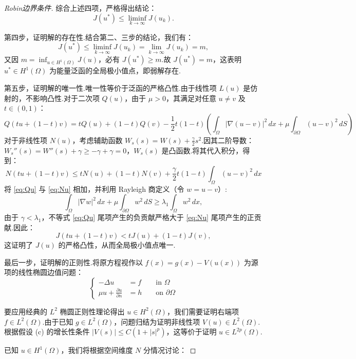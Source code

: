 \begin{proof}[Robin边界条件]
综合上述四项，严格得出结论：
$$J(u^*) \le \liminf_{k \to \infty} J(u_k).$$

第四步，证明解的存在性.结合第二、三步的结论，我们有：
$$J(u^*) \le \liminf_{k \to \infty} J(u_k) = \lim_{k \to \infty} J(u_k) = m,$$
又因 $m = \inf_{u \in H^1(\Omega)} J(u)$，必有 $J(u^*) \ge m$.故 $J(u^*) = m$，这表明 $u^{*} \in H^1(\Omega)$ 为能量泛函的全局极小值点，即弱解存在.

第五步，证明解的唯一性.唯一性等价于泛函的严格凸性.由于线性项 $L(u)$ 是仿射的，不影响凸性.对于二次项 $Q(u)$，由于 $\mu > 0$，其满足对任意 $u \neq v$ 及 $t \in (0, 1)$：
\begin{equation}\label{eq:Qu}
Q(tu + (1-t)v) = tQ(u) + (1-t)Q(v) - \frac{1}{2}t(1-t)\left( \int_{\Omega} |\nabla(u-v)|^2 \, dx + \mu \int_{\partial \Omega} (u-v)^2 \, dS \right)
\end{equation}
对于非线性项 $N(u)$，考虑辅助函数 $W_s(s) = W(s) + \frac{\gamma}{2}s^2$.因其二阶导数：$W_s''(s) = W''(s) + \gamma \ge -\gamma + \gamma = 0$，$W_s(s)$ 是凸函数.将其代入积分，得到：
\begin{equation}\label{eq:Nu}
N(tu + (1-t)v) \le tN(u) + (1-t)N(v) + \frac{\gamma}{2}t(1-t)\int_{\Omega} (u-v)^2 \, dx
\end{equation}
将 \eqref{eq:Qu} 与 \eqref{eq:Nu} 相加，并利用 Rayleigh 商定义（令 $w = u - v$）:
$$\int_{\Omega} |\nabla w|^2 \, dx + \mu \int_{\partial \Omega} w^2 \, dS \ge \lambda_1 \int_{\Omega} w^2 \, dx,$$
由于 $\gamma < \lambda_1$，不等式 \eqref{eq:Qu} 尾项产生的负贡献严格大于 \eqref{eq:Nu} 尾项产生的正贡献.因此：
$$J(tu + (1-t)v) < tJ(u) + (1-t)J(v),$$
这证明了 $J(u)$ 的严格凸性，从而全局极小值点唯一.

最后一步，证明解的正则性.将原方程视作以 $f(x)=g(x) - V(u(x))$ 为源项的线性椭圆边值问题：
\begin{equation}\label{eq:linearized}
\left\{\begin{aligned}
-\Delta u &=f & & \text { in } \Omega \\
 \mu u + \frac{\partial u}{\partial n} &=h & & \text { on } \partial \Omega
\end{aligned}\right.
\end{equation}  

要应用经典的 $L^2$ 椭圆正则性理论得出 $u \in H^2(\Omega)$，我们需要证明右端项 $f \in L^2(\Omega)$.由于已知 $g \in L^2(\Omega)$，问题归结为证明非线性项 $V(u) \in L^2(\Omega)$.根据假设 (c) 的增长性条件 $|V(s)| \le C(1 + |s|^p)$，这等价于证明 $u \in L^{2p}(\Omega)$.

已知 $u \in H^1(\Omega)$，我们将根据空间维度 $N$ 分情况讨论：


\end{proof}
